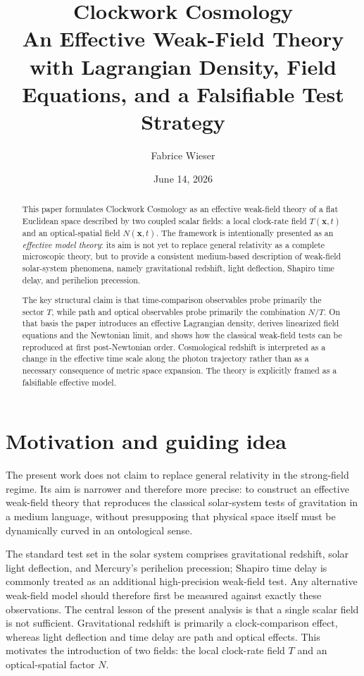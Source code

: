 \documentclass[11pt,a4paper]{article}
\title{\textbf{Clockwork Cosmology}\\
An Effective Weak-Field Theory with Lagrangian Density, Field Equations, and a Falsifiable Test Strategy}
\author{Fabrice Wieser}
\date{June 14, 2026}
\begin{document}
\maketitle

\begin{abstract}
This paper formulates Clockwork Cosmology as an effective weak-field theory of a flat Euclidean space described by two coupled scalar fields: a local clock-rate field $T(\mathbf{x},t)$ and an optical-spatial field $N(\mathbf{x},t)$. The framework is intentionally presented as an \emph{effective model theory}: its aim is not yet to replace general relativity as a complete microscopic theory, but to provide a consistent medium-based description of weak-field solar-system phenomena, namely gravitational redshift, light deflection, Shapiro time delay, and perihelion precession.

The key structural claim is that time-comparison observables probe primarily the sector $T$, while path and optical observables probe primarily the combination $N/T$. On that basis the paper introduces an effective Lagrangian density, derives linearized field equations and the Newtonian limit, and shows how the classical weak-field tests can be reproduced at first post-Newtonian order. Cosmological redshift is interpreted as a change in the effective time scale along the photon trajectory rather than as a necessary consequence of metric space expansion. The theory is explicitly framed as a falsifiable effective model.
\end{abstract}

\section{Motivation and guiding idea}
The present work does not claim to replace general relativity in the strong-field regime. Its aim is narrower and therefore more precise: to construct an effective weak-field theory that reproduces the classical solar-system tests of gravitation in a medium language, without presupposing that physical space itself must be dynamically curved in an ontological sense.

The standard test set in the solar system comprises gravitational redshift, solar light deflection, and Mercury's perihelion precession; Shapiro time delay is commonly treated as an additional high-precision weak-field test. Any alternative weak-field model should therefore first be measured against exactly these observations. The central lesson of the present analysis is that a single scalar field is not sufficient. Gravitational redshift is primarily a clock-comparison effect, whereas light deflection and time delay are path and optical effects. This motivates the introduction of two fields: the local clock-rate field $T$ and an optical-spatial factor $N$.
\end{document}
